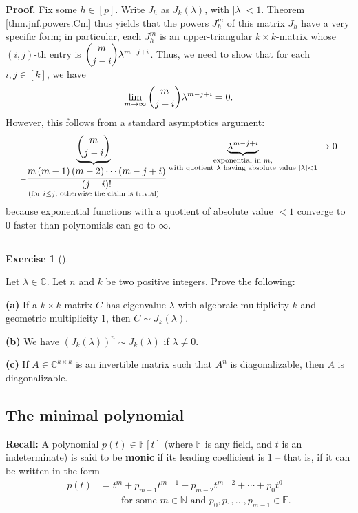 \documentclass[numbers=enddot,12pt,final,onecolumn,notitlepage]{scrartcl}%
\newcounter{exer}
\numberwithin{exer}{subsection}
\theoremstyle{definition}
\newtheorem{exmp}[exer]{Exercise}
\newenvironment{exercise}[1][]
{\begin{exmp}[#1]\begin{leftbar}}
{\end{leftbar}\end{exmp}}
\newenvironment{proof}[1][Proof]{\noindent\textbf{#1.} }{\ \rule{0.5em}{0.5em}}
\begin{document}
\begin{proof}
Fix some $h\in\left[  p\right]  $. Write $J_{h}$ as $J_{k}\left(
\lambda\right)  $, with $\left\vert \lambda\right\vert <1$. Theorem
\ref{thm.jnf.powers.Cm} thus yields that the powers $J_{h}^{m}$ of this matrix
$J_{h}$ have a very specific form; in particular, each $J_{h}^{m}$ is an
upper-triangular $k\times k$-matrix whose $\left(  i,j\right)  $-th entry is
$\dbinom{m}{j-i}\lambda^{m-j+i}$. Thus, we need to show that for each
$i,j\in\left[  k\right]  $, we have%
\[
\lim\limits_{m\rightarrow\infty}\dbinom{m}{j-i}\lambda^{m-j+i}=0.
\]
However, this follows from a standard asymptotics argument:%
\[
\underbrace{\dbinom{m}{j-i}}_{\substack{=\dfrac{m\left(  m-1\right)  \left(
m-2\right)  \cdots\left(  m-j+i\right)  }{\left(  j-i\right)  !}\\\text{(for
}i\leq j\text{; otherwise the claim is trivial)}}}\underbrace{\lambda^{m-j+i}%
}_{\substack{\text{exponential in }m\text{,}\\\text{with quotient }%
\lambda\text{ having absolute value }\left\vert \lambda\right\vert
<1}}\rightarrow0
\]
because exponential functions with a quotient of absolute value $<1$ converge
to $0$ faster than polynomials can go to $\infty$.
\end{proof}

\begin{exercise}
 Let $\lambda\in\mathbb{C}$. Let $n$ and $k$ be two positive integers.
Prove the following: \medskip

\textbf{(a)} If a $k\times k$-matrix $C$ has eigenvalue $\lambda$ with
algebraic multiplicity $k$ and geometric multiplicity $1$, then $C\sim
J_{k}\left(  \lambda\right)  $. \medskip

\textbf{(b)} We have $\left(  J_{k}\left(  \lambda\right)  \right)  ^{n}\sim
J_{k}\left(  \lambda\right)  $ if $\lambda\neq0$. \medskip

\textbf{(c)} If $A\in\mathbb{C}^{k\times k}$ is an invertible matrix such that
$A^{n}$ is diagonalizable, then $A$ is diagonalizable.
\end{exercise}

\subsection{The minimal polynomial}

\textbf{Recall:} A polynomial $p\left(  t\right)  \in\mathbb{F}\left[
t\right]  $ (where $\mathbb{F}$ is any field, and $t$ is an indeterminate) is
said to be \textbf{monic} if its leading coefficient is $1$ -- that is, if it
can be written in the form%
\begin{align*}
p\left(  t\right)   &  =t^{m}+p_{m-1}t^{m-1}+p_{m-2}t^{m-2}+\cdots+p_{0}%
t^{0}\\
&  \ \ \ \ \ \ \ \ \ \ \text{for some }m\in\mathbb{N}\text{ and }p_{0}%
,p_{1},\ldots,p_{m-1}\in\mathbb{F}.
\end{align*}
\end{document}
